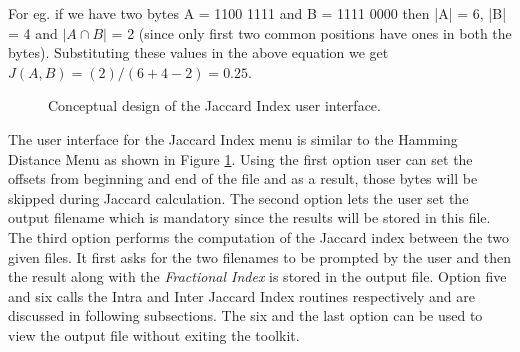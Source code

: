 	For eg. if we have two bytes A = 1100 1111 and B = 1111 0000 then |A| = 6, |B| = 4 and $|A \cap B|$ = 2 (since only first two common positions have ones in both the bytes). Substituting these values in the above equation we get $J(A,B) = (2) / ( 6 + 4 - 2) = 0.25$.\\

	\begin{figure}[h]
	\centering
	\caption{Conceptual design of the Jaccard Index user interface.}
	\label{img:jaccard_ui}
	\end{figure}
	The user interface for the Jaccard Index menu is similar to the Hamming Distance Menu as shown in Figure \ref{img:jaccard_ui}. Using the first option user can set the offsets from beginning and end of the file and as a result, those bytes will be skipped during Jaccard calculation. The second option lets the user set the output filename which is mandatory since the results will be stored in this file. The third option performs the computation of the Jaccard index between the two given
	files. It first asks for the two filenames to be prompted by the user and then the result along with the \emph{Fractional Index} is stored in the output file. Option five and six calls the Intra and Inter Jaccard Index routines respectively and are discussed in following subsections. The six and the last option can be used to view the output file without exiting the toolkit.\\

